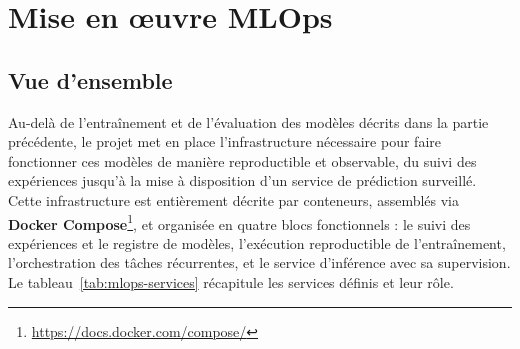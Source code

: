 \section{Mise en œuvre MLOps}
\label{sec:mlops}

\subsection{Vue d'ensemble}

Au-delà de l'entraînement et de l'évaluation des modèles décrits dans la partie précédente, le projet met en place l'infrastructure nécessaire pour faire fonctionner ces modèles de manière reproductible et observable, du suivi des expériences jusqu'à la mise à disposition d'un service de prédiction surveillé.
Cette infrastructure est entièrement décrite par conteneurs, assemblés via \textbf{Docker Compose}\footnote{\url{https://docs.docker.com/compose/}}, et organisée en quatre blocs fonctionnels : le suivi des expériences et le registre de modèles, l'exécution reproductible de l'entraînement, l'orchestration des tâches récurrentes, et le service d'inférence avec sa supervision.
Le tableau~\ref{tab:mlops-services} récapitule les services définis et leur rôle.

